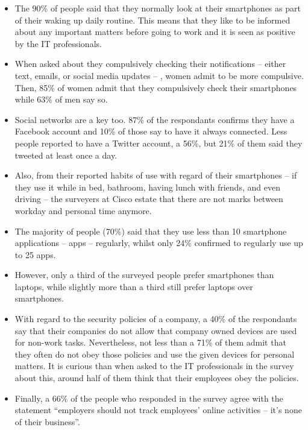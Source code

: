 \begin{itemize}
	\item The 90\% of people said that they normally look at their smartphones as part of their waking up daily routine. This means that they like to be informed about any important matters before going to work and it is seen as positive by the IT professionals.
	\item When asked about they compulsively checking their notifications -- either text, emails, or social media updates -- , women admit to be more compulsive. Then, 85\% of women admit that they compulsively check their smartphones while 63\% of men say so.
	\item Social networks are a key too. 87\% of the respondants confirms they have a Facebook account and 10\% of those say to have it always connected. Less people reported to have a Twitter account, a 56\%, but 21\% of them said they tweeted at least once a day.
	\item Also, from their reported habits of use with regard of their smartphones -- if they use it while in bed, bathroom, having lunch with friends, and even driving -- the surveyers at Cisco estate that there are not marks between workday and personal time anymore.
	\item The majority of people (70\%) said that they use less than 10 smartphone applications -- apps -- regularly, whilst only 24\% confirmed to regularly use up to 25 apps.
	\item However, only a third of the surveyed people prefer smartphones than laptops, while slightly more than a third still prefer laptops over smartphones.
	\item With regard to the security policies of a company, a 40\% of the respondants say that their companies do not allow that company owned devices are used for non-work tasks. Nevertheless, not less than a 71\% of them admit that they often do not obey those policies and use the given devices for personal matters. It is curious than when asked to the IT professionals in the survey about this, around half of them think that their employees obey the policies.
	\item Finally, a 66\% of the people who responded in the survey agree with the statement ``employers should not track employees' online activities -- it's none of their business''.
\end{itemize}

